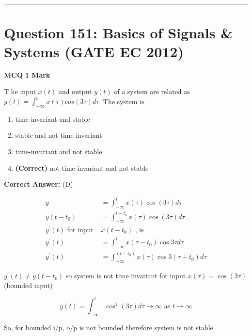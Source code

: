 \documentclass[11pt,a4paper]{article}
\begin{document}
\vspace{1.5em}
\hrule
\vspace{1.5em}

\section*{Question 151: Basics of Signals \& Systems (GATE EC 2012)}
\noindent \textbf{\color{primary}MCQ} \hfill \textbf{\color{secondary}1 Mark}


\noindent T he input $x(t)$ and output $y(t)$ of a system are related as $y(t)=\int_{-\infty }^{t}x(\tau )cos(3\tau )d\tau$. The system is


\begin{enumerate}[label=(\Alph*)]
    \item time-invariant and stable
    \item stable and not time-invariant
    \item time-invariant and not stable
    \item \textbf{(Correct)} not time-invariant and not stable
\end{enumerate}

\noindent \textbf{Correct Answer:} (D)

\begin{tcolorbox}[solbox, title=Detailed Solution -- Question 151]
\[
\begin{aligned} y&=\int_{-\infty}^{t} x(\tau) \cos (3 \tau) d \tau \\ y\left(t-t_{0}\right)&=\int_{-\infty}^{t-t_{0}} x(\tau) \cos (3 \tau) d \tau \\ y^{\prime}(t) \text { for input } &x\left(t-t_{0}\right) \text { , is }\\ y^{\prime}(t)&=\int_{-\infty}^{t} x\left(\tau-t_{0}\right) \cos 3 \tau d \tau \\ y^{\prime}(t)&=\int_{-\infty}^{\left(t-t_{0}\right)} x(\tau) \cos 3\left(\tau+t_{0}\right) d \tau \end{aligned}
\]

$y^{\prime}(t) \neq y\left(t-t_{0}\right)$ 
so system is not time invariant for input $x(\tau)=\cos (3 \tau)$ (bounded input)

\[
y(t)=\int_{-\infty}^{t} \cos ^{2}(3 \tau) d \tau \rightarrow \infty \text { as } t \rightarrow \infty
\]

 So, for bounded i/p, o/p is not bounded therefore system is not stable.
\end{tcolorbox}
\end{document}
